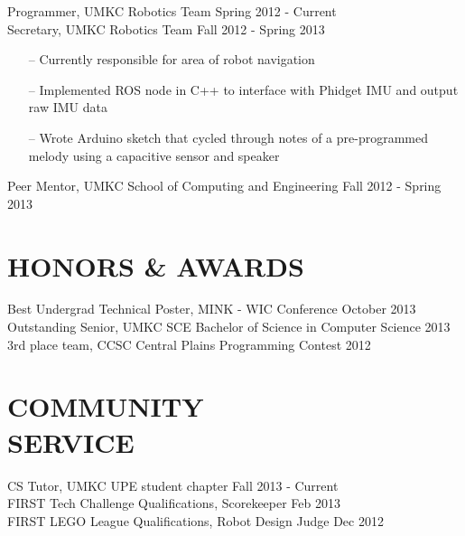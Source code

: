 \documentclass[line,margin]{res}
\begin{document}
\begin{resume}
		
		Programmer, UMKC Robotics Team \hfill Spring 2012 - Current \\ 
		Secretary, UMKC Robotics Team \hfill  Fall 2012 - Spring 2013 	
		\begin{itemize} [leftmargin=5mm]  \itemsep -2pt %
                 \item[--] Currently responsible for area of robot navigation 
                 \item[--] Implemented ROS node in C++ to interface with Phidget IMU and output raw IMU data
                 \item[--] Wrote Arduino sketch that cycled through notes of a pre-programmed melody using a capacitive sensor and speaker
                 \end{itemize} 


		Peer Mentor, UMKC School of Computing and Engineering \hfill Fall 2012 - Spring 2013 

\section{HONORS \& AWARDS}
		Best Undergrad Technical Poster, MINK - WIC Conference \hfill October 2013	\\
		Outstanding Senior, UMKC SCE Bachelor of Science in Computer Science \hfill 2013 \\
		3rd place team, CCSC Central Plains Programming Contest \hfill 2012 
\section{COMMUNITY \\ SERVICE}  
            	CS Tutor, UMKC UPE student chapter  \hfill Fall 2013 - Current \\
                FIRST Tech Challenge Qualifications, Scorekeeper \hfill Feb 2013 \\
		FIRST LEGO League Qualifications, Robot Design Judge \hfill Dec 2012  \\
\end{resume}
\end{document}
